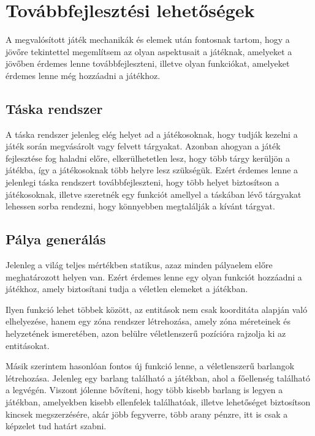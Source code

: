 \chapter{Továbbfejlesztési lehetőségek}

\indent \indent A megvalósított játék mechanikák és elemek után fontosnak tartom, hogy a jövőre tekintettel megemlítsem az olyan aspektusait a játéknak, amelyeket a jövőben érdemes lenne továbbfejleszteni, illetve olyan funkciókat, amelyeket érdemes lenne még hozzáadni a játékhoz.



\section{Táska rendszer}

\indent \indent A táska rendszer jelenleg elég helyet ad a játékosoknak, hogy tudják kezelni a játék során megvásárolt vagy felvett tárgyakat. Azonban ahogyan a játék fejlesztése fog haladni előre, elkerülhetetlen lesz, hogy több tárgy kerüljön a játékba, így a játékosoknak több helyre lesz szükségük. Ezért érdemes lenne a jelenlegi táska rendszert továbbfejleszteni, hogy több helyet biztosítson a játékosoknak, illetve szeretnék egy funkciót amellyel a táskában lévő tárgyakat lehessen sorba rendezni, hogy könnyebben megtalálják a kívánt tárgyat.

\section{Pálya generálás}
\indent \indent Jelenleg a világ teljes mértékben statikus, azaz minden pályaelem előre meghatározott helyen van. Ezért érdemes lenne egy olyan funkciót hozzáadni a játékhoz, amely biztosítani tudja a véletlen elemeket a játékban.

Ilyen funkció lehet többek között, az entitások nem csak koorditáta alapján való elhelyezése, hanem egy zóna rendszer létrehozása, amely zóna méreteinek és helyzetének ismeretében, azon belülre véletlenszerű pozícióra rajzolja ki az entitásokat.

Másik szerintem hasonlóan fontos új funkció lenne, a véletlenszerű barlangok létrehozása. Jelenleg egy barlang található a játékban, ahol a főellenség található a legvégén. Viszont jólenne bővíteni, hogy több kisebb barlang is legyen a játékban, amelyekben kisebb ellenfelek találhatóak, illetve lehetőséget biztosítson kincsek megszerzésére, akár jöbb fegyverre, több arany pénzre, itt is csak a képzelet tud határt szabni.

